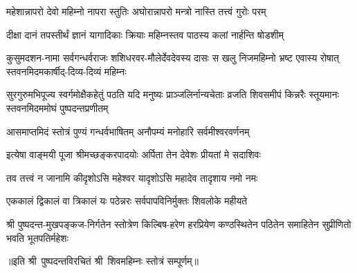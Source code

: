 \twolineshloka
{महेशान्नापरो देवो महिम्नो नापरा स्तुतिः}
{अघोरान्नापरो मन्त्रो नास्ति तत्त्वं गुरोः परम्}%

\twolineshloka
{दीक्षा दानं तपस्तीर्थं ज्ञानं यागादिकाः क्रियाः}
{महिम्नस्तव पाठस्य कलां नार्हन्ति षोडशीम्}%

\fourlineindentedshloka
{कुसुमदशन-नामा सर्वगन्धर्वराजः}
{शशिधरवर-मौलेर्देवदेवस्य दासः}
{स खलु निजमहिम्नो भ्रष्ट एवास्य रोषात्}
{स्तवनमिदमकार्षीद्-दिव्य-दिव्यं महिम्नः}%

\fourlineindentedshloka
{सुरगुरुमभिपूज्य स्वर्गमोक्षैकहेतुं}
{पठति यदि मनुष्यः प्राञ्जलिर्नान्यचेताः}
{व्रजति शिवसमीपं किन्नरैः स्तूयमानः}
{स्तवनमिदममोघं पुष्पदन्तप्रणीतम्}%

\twolineshloka
{आसमाप्तमिदं स्तोत्रं पुण्यं गन्धर्वभाषितम्}
{अनौपम्यं मनोहारि सर्वमीश्वरवर्णनम्}%

\twolineshloka
{इत्येषा वाङ्मयी पूजा श्रीमच्छङ्करपादयोः}
{अर्पिता तेन देवेशः प्रीयतां मे सदाशिवः}%

\twolineshloka
{तव तत्त्वं न जानामि कीदृशोऽसि महेश्वर}
{यादृशोऽसि महादेव तादृशाय नमो नमः}%

\twolineshloka
{एककालं द्विकालं वा त्रिकालं यः पठेन्नरः}
{सर्वपापविनिर्मुक्तः शिवलोके महीयते}%

\fourlineindentedshloka
{श्री पुष्पदन्त-मुखपङ्कज-निर्गतेन}
{स्तोत्रेण किल्बिष-हरेण हरप्रियेण}
{कण्ठस्थितेन पठितेन समाहितेन}
{सुप्रीणितो भवति भूतपतिर्महेशः}%

॥इति श्री~पुष्पदन्तविरचितं श्री~शिवमहिम्नः स्तोत्रं सम्पूर्णम्॥